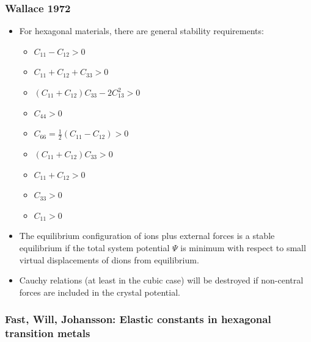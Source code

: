 \documentclass[11pt]{article}
\begin{document}
\subsubsection{Wallace 1972}
\label{sec:orgd7663f5}
\begin{itemize}
\item For hexagonal materials, there are general stability requirements:
\begin{itemize}
\item \(C_{11} - C_{12} > 0\)
\item \(C_{11} + C_{12} + C_{33} > 0\)
\item \(( C_{11} + C_{12} ) C_{33} - 2C_{13}^{2} > 0\)
\item \(C_{44} > 0\)
\item \(C_{66} = \frac{1}{2}(C_{11} - C_{12}) > 0\)
\item \(( C_{11} + C_{12} )C_{33} > 0\)
\item \(C_{11} + C_{12} > 0\)
\item \(C_{33} > 0\)
\item \(C_{11} > 0\)
\end{itemize}
\item The equilibrium configuration of ions plus external forces is a stable
equilibrium if the total system potential \(\Psi\) is minimum with respect
to small virtual displacements of dions from equilibrium.
\item Cauchy relations (at least in the cubic case) will be destroyed if
non-central forces are included in the crystal potential.
\end{itemize}

\subsubsection{Fast, Will, Johansson: Elastic constants in hexagonal transition metals}
\label{sec:org1b38817}
\end{document}
